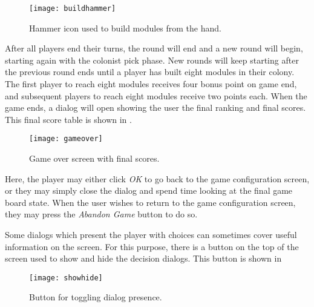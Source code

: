 \begin{figure}[ht]
\centerline{\mbox{\texttt{[image: buildhammer]}}}
\caption{Hammer icon used to build modules from the hand.}\label{ud:buildhammer}
\end{figure}

After all players end their turns, the round will end and a new round will begin,
starting again with the colonist pick phase. New rounds will keep
starting after the previous round ends until a player has built eight
modules in their colony. The first player to reach eight modules receives
four bonus point on game end, and subsequent players to reach eight modules
receive two points each. When the game ends, a dialog will open showing the user
the final ranking and final scores. This final score table is shown in
.

\begin{figure}[ht]
\centerline{\mbox{\texttt{[image: gameover]}}}
\caption{Game over screen with final scores.}\label{ud:gameover}
\end{figure}

Here, the player may either click \emph{OK} to go back to the game configuration
screen, or they may simply close the dialog and spend time looking at the final
game board state. When the user wishes to return to the game configuration screen,
they may press the \emph{Abandon Game} button to do so.

Some dialogs which present the player with choices can sometimes cover
useful information on the screen. For this purpose, there is a button on the top
of the screen used to show and hide the decision dialogs. This button is shown in

\begin{figure}[ht]
\centerline{\mbox{\texttt{[image: showhide]}}}
\caption{Button for toggling dialog presence.}\label{ud:showhide}
\end{figure}

\clearpage
